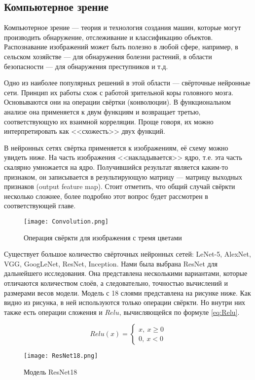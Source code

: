 \subsection{Компьютерное зрение}

Компьютерное зрение --- теория и технология создания машин, которые могут
производить обнаружение, отслеживание и классификацию объектов. Распознавание
изображений может быть полезно в любой сфере, например, в сельском хозяйстве ---
для обнаружения болезни растений, в области безопасности --- для обнаружения
преступников и т.д.

Одно из наиболее популярных решений в этой области --- свёрточные нейронные
сети. Принцип их работы схож с работой зрительной коры головного мозга.
Основываются они на операции свёртки (конволюции). В функциональном анализе
она применяется к двум функциям и возвращает третью, соответствующую их
взаимной корреляции. Проще говоря, их можно интерпретировать как <<схожесть>>
двух функций.

В нейронных сетях свёртка применяется к изображениям, её схему можно увидеть
ниже. На часть изображения <<накладывается>> ядро, т.е. эта часть скалярно
умножается на ядро. Получившийся результат является каким-то признаком, он
записывается в результирующую матрицу --- матрицу выходных признаков
(output feature map). Стоит отметить, что общий случай свёркти несколько
сложнее, более подробно этот вопрос будет рассмотрен в соответствующей
главе.

\begin{figure}[h!]
    \centering
    \texttt{[image: Convolution.png]}
    \caption{Операция свёркти для изображения с тремя цветами}
\end{figure}

Существует большое количество свёрточных нейронных сетей: LeNet-5, AlexNet,
VGG, GoogLeNet, ResNet, Inception. Нами была выбрана ResNet для дальнейшего
исследования. Она представлена несколькими вариантами, которые отличаются
количеством слоёв, а следовательно, точностью вычислений и размерами весов
модели. Модель с 18 слоями представлена на рисунке ниже. Как видно из
рисунка, в ней используются только операции свёркти. Но внутри них также
есть операции сложения и $Relu$, вычисляющейся по формуле \eqref{eq:Relu}.

\begin{equation}
    \label{eq:Relu}
    Relu(x) =
        \begin{cases*}
            x, ~ x \geqslant 0 \\
            0, ~ x < 0
        \end{cases*}
\end{equation}

\begin{figure}[h!]
    \centering
    \texttt{[image: ResNet18.png]}
    \caption{Модель ResNet18}
\end{figure}

\newpage
